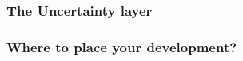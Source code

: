 \documentclass[8pt]{beamer}
\begin{document}
\begin{frame}
  \frametitle{The Uncertainty layer}
  \begin{block}{}
  \end{block}
\end{frame}
\begin{frame}
  \frametitle{Where to place your development?}
  \begin{block}{}
  \end{block}
\end{frame}
\end{document}
